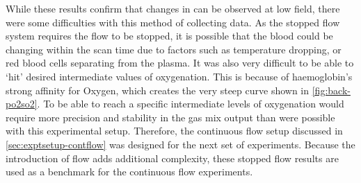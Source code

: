 While these results confirm that changes in \SOtwo can be observed at low field, there were some difficulties with this method of collecting data.
As the stopped flow system requires the flow to be stopped, it is possible that the blood could be changing within the scan time due to factors such as temperature dropping, or red blood cells separating from the plasma.
It was also very difficult to be able to `hit' desired intermediate values of oxygenation.
This is because of haemoglobin's strong affinity for Oxygen, which creates the very steep curve shown in \autoref{fig:back-po2so2}.
To be able to reach a specific intermediate levels of oxygenation would require more precision and stability in the gas mix output than were possible with this experimental setup.
Therefore, the continuous flow setup discussed in \autoref{sec:exptsetup-contflow} was designed for the next set of experiments.
Because the introduction of flow adds additional complexity, these stopped flow results are used as a benchmark for the continuous flow experiments.
